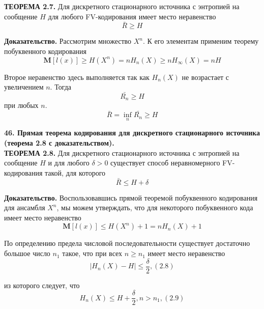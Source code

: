 \documentclass[14pt]{article}
\begin{document}
\textbf{ТЕОРЕМА 2.7.} Для дискретного стационарного источника с энтропией на сообщение \(H\) для любого FV-кодирования имеет место неравенство
\begin{displaymath}
    \bar{R} \geq H
\end{displaymath}

\textbf{Доказательство.} Рассмотрим множество \(X^n\). К его элементам применим теорему побуквенного кодирования
\begin{displaymath}
    \textbf{M}[l(x)] \geq H(X^n) = nH_n(X) \geq nH_{\infty}(X) = nH
\end{displaymath}

Второе неравенство здесь выполняется так как \(H_n(X)\) не возрастает с увеличением \(n\). Тогда
\begin{displaymath}
    \bar{R_n} \geq H
\end{displaymath}
при любых \(n\).
\begin{displaymath}
    \bar{R} = \inf_{n}\bar{R_n} \geq H
\end{displaymath}


\bigskip
\textbf{46. Прямая теорема кодирования для дискретного стационарного источника (теорема 2.8 с доказательством).} \\

\textbf{ТЕОРЕМА 2.8.} Для дискретного стационарного источника с энтропией на сообщение \(H\) и для любого \(\delta > 0\) существует способ неравномерного FV-кодирования такой, для которого
\begin{displaymath}
    \bar{R} \leq H + \delta
\end{displaymath}

\textbf{Доказательство.} Воспользовавшись прямой теоремой побуквенного кодирования для ансамбля \(X^n\), мы можем утверждать, что для некоторого побуквенного кода имеет место неравенство
\begin{displaymath}
    \textbf{M}[l(x)] \leq H(X^n) + 1 = nH_n(X) + 1
\end{displaymath}

По определению предела числовой последовательности существует достаточно большое число \(n_1\) такое, что при всех \(n \geq n_1\) имеет место неравенство
\begin{displaymath}
    |H_n(X) - H| \leq \frac{\delta}{2}, (2.8)
\end{displaymath}

из которого следует, что
\begin{displaymath}
    H_n(X) \leq H + \frac{\delta}{2}, n > n_1, (2.9)
\end{displaymath}
\end{document}

